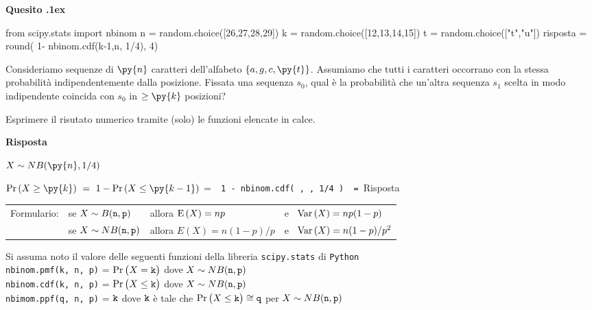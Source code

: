 \documentclass[11pt,twoside,a4paper]{article}
\def\Ex{{\rm E\,}}
\def\Var{{\rm Var\,}}
\newcounter{quesito}
\newenvironment{question}{\bigskip\addtocounter{quesito}{1}\bigskip\bigskip\par\textbf{Quesito \thequesito.\kern1ex}}{\vspace{\parskip}}
\newenvironment{answer}{\par\textbf{Risposta\quad}}{\vspace{\parskip}}
\begin{document}
\begin{question}
\begin{pycode}
from scipy.stats import nbinom
n = random.choice([26,27,28,29])
k = random.choice([12,13,14,15])
t = random.choice(["t","u"])
risposta = round( 1- nbinom.cdf(k-1,n, 1/4), 4)
\end{pycode}
  Consideriamo sequenze di $\py{n}$ caratteri dell'alfabeto $\{a,g,c,\py{t}\}$. 
  Assumiamo che tutti i caratteri occorrano con la stessa probabilità indipendentemente dalla posizione.
  Fissata una sequenza $s_0$, qual è la probabilità che un'altra sequenza $s_1$ 
  scelta in modo indipendente coincida con $s_0$ in $\ge\py{k}$ posizioni?   
  
  Esprimere il risutato numerico tramite (solo) le funzioni elencate in calce.
  \begin{answer}
  
  $X\sim NB(\py{n}, 1/4)$
  
  $\Pr(X\ge \py{k})\ =\ 1-\Pr(X\le \py{k-1})$
  \quad =\ 
  {\tt{\color{blue}  1 -  nbinom.cdf( , , 1/4 )}
  \ =\ 
  }{\color{blue}\hfill Risposta}
  \end{answer}
\end{question}
  

\vfill
\hrulefill

\begin{tabular}{@{}llll}
Formulario:& se $X\sim B({\tt n},{\tt p})$ & allora $\Ex(X)=np$&e \ $\Var(X)=np(1-p)$\\
           & se $X\sim NB({\tt n},{\tt p})$& allora $E(X)=n(1-p)/p$&e \ $\Var(X)=n(1-p)/p^2$\\
\end{tabular}

Si assuma noto il valore delle seguenti funzioni della libreria {\tt scipy.stats\/} di  {\tt Python\/}\\
{\tt nbinom.pmf(k, n, p)} = $\Pr\big(X={\tt k}\big)$ dove $X\sim NB({\tt n},{\tt p})$\\
{\tt nbinom.cdf(k, n, p)} = $\Pr\big(X\le{\tt k}\big)$ dove  $X\sim NB({\tt n},{\tt p})$ \\
{\tt nbimom.ppf(q, n, p)} = ${\tt k}$ dove ${\tt k}$ è tale che $\Pr\big(X\le{\tt k}\big)\cong{\tt q}$ per $X\sim NB({\tt n},{\tt p})$ 
\end{document}

